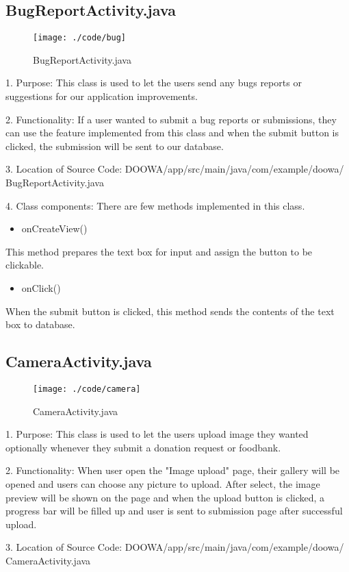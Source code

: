 \documentclass[conference]{IEEEtran}
\begin{document}
\subsection{BugReportActivity.java}
\begin{figure}[h!]
\texttt{[image: ./code/bug]}
\centering
\caption{BugReportActivity.java}
\end{figure}
1. Purpose: This class is used to let the users send any bugs reports or suggestions for our application improvements.\break
\par 2. Functionality: If a user wanted to submit a bug reports or submissions, they can use the feature implemented from this class and when the submit button is clicked, the submission will be sent to our database.\break

3. Location of Source Code: DOOWA/app/src/main/java/com/example/doowa/ BugReportActivity.java\break

4. Class components: There are few methods implemented in this class.
\begin{itemize}
\item onCreateView()
\end{itemize}
This method prepares the text box for input and assign the button to be clickable.
\begin{itemize}
\item onClick()
\end{itemize}
When the submit button is clicked, this method sends the contents of the text box to database.
\break
\subsection{CameraActivity.java}
\begin{figure}[h!]
\texttt{[image: ./code/camera]}
\centering
\caption{CameraActivity.java}
\end{figure}
1. Purpose: This class is used to let the users upload image they wanted optionally whenever they submit a donation request or foodbank.\break
\par 2. Functionality: When user open the "Image upload" page, their gallery will be opened and users can choose any picture to upload. After select, the image preview will be shown on the page and when the upload button is clicked, a progress bar will be filled up and user is sent to submission page after successful upload. \break

3. Location of Source Code: DOOWA/app/src/main/java/com/example/doowa/ CameraActivity.java\break
\end{document}
